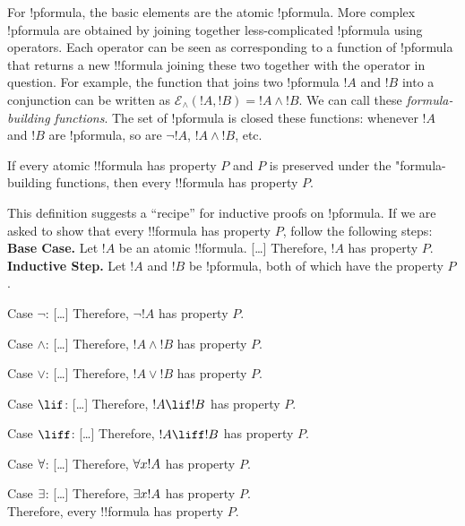 \documentclass[../../include/open-logic-section]{subfiles}
\begin{document}
\begin{explain}
For !p{formula}, the basic elements are the atomic !p{formula}. More complex !p{formula} 
are obtained by joining together less-complicated !p{formula} using operators. Each 
operator can be seen as corresponding to a function of !p{formula} that returns a new 
!!{formula} joining these two together with the operator in question. For example, the function 
that joins two !p{formula} $!A$ and $!B$ into a conjunction can be written as $\mathcal E _\land 
(!A, !B) = !A \land !B$. We can call these \emph{formula-building functions}. The set of 
!p{formula} is closed these functions: whenever $!A$ and $!B$ are !p{formula}, so are 
$\lnot !A$, $!A \land !B$, etc. 
\end{explain}

\begin{defn}
If every atomic !!{formula} has property $P$ and $P$ is preserved under the "{formula}-building 
functions, then every !!{formula} has property $P$.
\end{defn}

\begin{explain}
This definition suggests a ``recipe'' for inductive proofs on !p{formula}. If we are asked 
to show that every !!{formula} has property $P$, follow the following steps:\\

\textbf{Base Case.} Let $!A$ be an atomic !!{formula}. [\ldots] Therefore, $!A$ has 
property $P$.\\

\textbf{Inductive Step.} Let $!A$ and $!B$ be !p{formula}, both of which have the property $P$.

Case $\lnot$: [\ldots] Therefore, $\lnot !A$ has property $P$.

Case $\land$: [\ldots] Therefore, $!A \land !B$ has property $P$. 

Case $\lor$: [\ldots] Therefore, $!A \lor !B$ has property $P$. 

Case $\lif$: [\ldots] Therefore, $!A \lif !B$ has property $P$.

Case $\liff$: [\ldots] Therefore, $!A \liff !B$ has property $P$.

Case $\lforall[]$: [\ldots] Therefore, $\lforall[x] !A$ has property $P$.

Case $\lexists[]$: [\ldots] Therefore, $\lexists[x] !A$ has property $P$. \\

Therefore, every !!{formula} has property $P$.
\end{explain}
\end{document}
